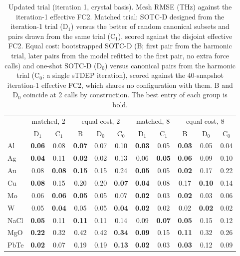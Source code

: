 \begin{table}[t]
\caption{Updated trial (iteration 1, crystal basis). Mesh RMSE (THz) against the iteration-1 effective FC2. Matched trial: SOTC-D designed from the iteration-1 trial (D$_1$) versus the better of random canonical subsets and pairs drawn from the same trial (C$_1$), scored against the disjoint effective FC2. Equal cost: bootstrapped SOTC-D (B; first pair from the harmonic trial, later pairs from the model refitted to the first pair, no extra force calls) and one-shot SOTC-D (D$_0$) versus canonical pairs from the harmonic trial (C$_0$; a single sTDEP iteration), scored against the 40-snapshot iteration-1 effective FC2, which shares no configuration with them. B and D$_0$ coincide at 2 calls by construction. The best entry of each group is bold.}
\label{tab:selfconsistent_crystal}
\begin{ruledtabular}
\begin{tabular}{lcccccccccc}
 & \multicolumn{2}{c}{matched, 2} & \multicolumn{3}{c}{equal cost, 2} & \multicolumn{2}{c}{matched, 8} & \multicolumn{3}{c}{equal cost, 8}\\
 & D$_1$ & C$_1$ & B & D$_0$ & C$_0$ & D$_1$ & C$_1$ & B & D$_0$ & C$_0$\\
\hline
Al & \textbf{0.06} & 0.08 & \textbf{0.07} & 0.07 & 0.10 & \textbf{0.03} & 0.05 & \textbf{0.03} & 0.05 & 0.04\\
Ag & \textbf{0.04} & 0.11 & \textbf{0.02} & 0.02 & 0.13 & 0.06 & \textbf{0.05} & \textbf{0.06} & 0.09 & 0.10\\
Au & 0.08 & \textbf{0.08} & \textbf{0.15} & 0.15 & 0.24 & \textbf{0.05} & 0.05 & \textbf{0.02} & 0.17 & 0.22\\
Cu & \textbf{0.08} & 0.15 & 0.20 & 0.20 & \textbf{0.07} & \textbf{0.04} & 0.08 & 0.17 & \textbf{0.10} & 0.14\\
Mo & 0.06 & \textbf{0.06} & \textbf{0.05} & 0.05 & 0.07 & \textbf{0.02} & 0.03 & \textbf{0.02} & 0.03 & 0.06\\
W & 0.05 & \textbf{0.04} & 0.05 & 0.05 & \textbf{0.04} & \textbf{0.02} & 0.02 & 0.02 & \textbf{0.02} & 0.02\\
NaCl & \textbf{0.05} & 0.11 & \textbf{0.11} & 0.11 & 0.14 & 0.09 & \textbf{0.07} & \textbf{0.05} & 0.15 & 0.12\\
MgO & \textbf{0.22} & 0.32 & 0.42 & 0.42 & \textbf{0.34} & \textbf{0.09} & 0.15 & \textbf{0.11} & 0.32 & 0.26\\
PbTe & \textbf{0.02} & 0.07 & 0.19 & 0.19 & \textbf{0.13} & \textbf{0.02} & 0.03 & \textbf{0.03} & 0.12 & 0.09\\

\end{tabular}
\end{ruledtabular}
\end{table}
